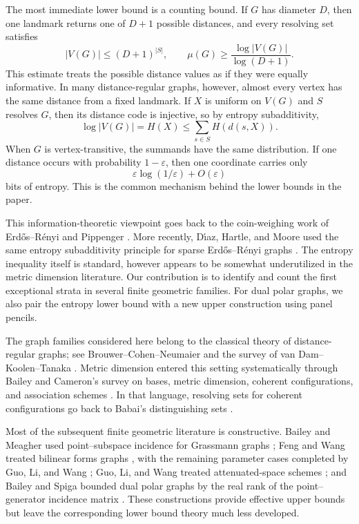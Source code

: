 \documentclass[11pt]{article}
\theoremstyle{definition}
\theoremstyle{remark}
\newcommand{\eps}{\varepsilon}
\begin{document}
The most immediate lower bound is a counting bound.  If $G$ has diameter
$D$, then one landmark returns one of $D+1$ possible distances, and every
resolving set satisfies
\[
        |V(G)|\leq (D+1)^{|S|},
        \qquad
        \mu(G)\geq \frac{\log |V(G)|}{\log(D+1)}.
\]
This estimate treats the possible distance values as if they were equally
informative.  In many distance-regular graphs, however, almost every 
vertex
has the same distance from a fixed landmark.  If $X$ is uniform on $V(G)$
and $S$ resolves $G$, then its distance code is injective, so by entropy subadditivity,
\[
        \log |V(G)|=H(X)
        \leq \sum_{s\in S}H(d(s,X)).
\]
When $G$ is vertex-transitive, the summands have the same distribution.  
If
one distance occurs with probability $1-\eps$, then one coordinate carries
only
\[
        \eps\log(1/\eps)+O(\eps)
\]
bits of entropy.  This is the common mechanism behind the lower bounds in
the paper.

This information-theoretic viewpoint goes back to the coin-weighing work 
of
Erd\H{o}s--R\'enyi and Pippenger
\cite{ErdosRenyi1963,Pippenger1977}.  More recently, D\'{\i}az, Hartle, and
Moore used the same entropy subadditivity principle for sparse
Erd\H{o}s--R\'enyi graphs \cite{DiazHartleMoore2026}.  The entropy inequality
itself is standard, however appears to be somewhat underutilized in the metric dimension literature.  Our contribution is to identify and count the first
exceptional strata in several finite geometric families.  For dual polar
graphs, we also pair the entropy lower bound with a new upper construction
using panel pencils.

The graph families considered here belong to the classical theory of
distance-regular graphs; see Brouwer--Cohen--Neumaier \cite{BCN} and the
survey of van Dam--Koolen--Tanaka \cite{VanDamKoolenTanaka}.  Metric
dimension entered this setting systematically through Bailey and Cameron's
survey on bases, metric dimension, coherent configurations, and 
association
schemes \cite{BaileyCameron}.  In that language, resolving sets for 
coherent
configurations go back to Babai's distinguishing sets
\cite{Babai1981,BaileyCameron}.

Most of the subsequent finite geometric literature is constructive.
Bailey and Meagher used point--subspace incidence for Grassmann graphs
\cite{BaileyMeagher}; Feng and Wang treated bilinear forms graphs
\cite{FengWang}, with the remaining parameter cases completed by Guo, Li,
and Wang \cite{GuoLiWangFour}; Guo, Li, and Wang treated attenuated-space
schemes \cite{GuoLiWang}; and Bailey and Spiga bounded dual polar graphs by the 
real
rank of the point--generator incidence matrix \cite{BaileySpiga}.  These
constructions provide effective upper bounds but leave the corresponding
lower bound theory much less developed.
\end{document}
